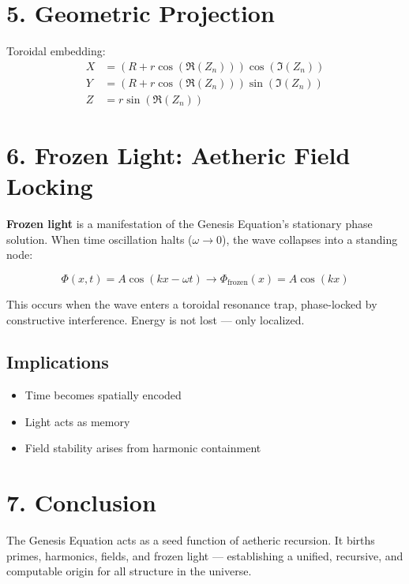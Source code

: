\documentclass[12pt]{book}
\begin{document}
\section*{5. Geometric Projection}

Toroidal embedding:
\[
\begin{aligned}
X &= (R + r \cos(\Re(Z_n))) \cos(\Im(Z_n)) \\
Y &= (R + r \cos(\Re(Z_n))) \sin(\Im(Z_n)) \\
Z &= r \sin(\Re(Z_n))
\end{aligned}
\]

\section*{6. Frozen Light: Aetheric Field Locking}

\textbf{Frozen light} is a manifestation of the Genesis Equation's stationary phase solution. When time oscillation halts (\( \omega \rightarrow 0 \)), the wave collapses into a standing node:

\[
\Phi(x, t) = A \cos(kx - \omega t) \rightarrow \Phi_{\text{frozen}}(x) = A \cos(kx)
\]

This occurs when the wave enters a toroidal resonance trap, phase-locked by constructive interference. Energy is not lost — only localized.

\subsection*{Implications}

\begin{itemize}
  \item Time becomes spatially encoded
  \item Light acts as memory
  \item Field stability arises from harmonic containment
\end{itemize}

\section*{7. Conclusion}

The Genesis Equation acts as a seed function of aetheric recursion. It births primes, harmonics, fields, and frozen light — establishing a unified, recursive, and computable origin for all structure in the universe.





\maketitle
\end{document}
